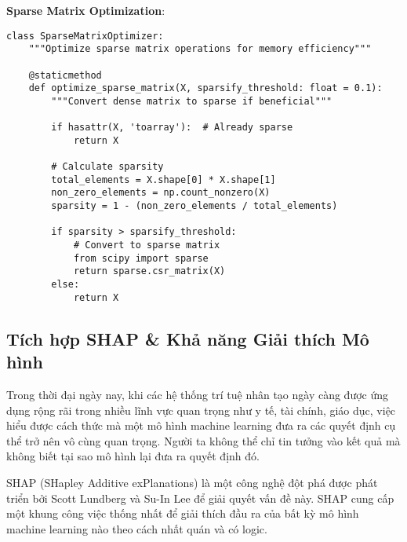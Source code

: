 \textbf{Sparse Matrix Optimization}:

\begin{verbatim}
class SparseMatrixOptimizer:
    """Optimize sparse matrix operations for memory efficiency"""
    
    @staticmethod
    def optimize_sparse_matrix(X, sparsify_threshold: float = 0.1):
        """Convert dense matrix to sparse if beneficial"""
        
        if hasattr(X, 'toarray'):  # Already sparse
            return X
            
        # Calculate sparsity
        total_elements = X.shape[0] * X.shape[1]
        non_zero_elements = np.count_nonzero(X)
        sparsity = 1 - (non_zero_elements / total_elements)
        
        if sparsity > sparsify_threshold:
            # Convert to sparse matrix
            from scipy import sparse
            return sparse.csr_matrix(X)
        else:
            return X
\end{verbatim}

\subsection{Tích hợp SHAP \& Khả năng Giải thích Mô hình}\label{subsec:shap-integration}

\noindent
Trong thời đại ngày nay, khi các hệ thống trí tuệ nhân tạo ngày càng được ứng dụng rộng rãi trong nhiều lĩnh vực quan trọng như y tế, tài chính, giáo dục, việc hiểu được cách thức mà một mô hình machine learning đưa ra các quyết định cụ thể trở nên vô cùng quan trọng. Người ta không thể chỉ tin tưởng vào kết quả mà không biết tại sao mô hình lại đưa ra quyết định đó.

SHAP (SHapley Additive exPlanations) là một công nghệ đột phá được phát triển bởi Scott Lundberg và Su-In Lee để giải quyết vấn đề này. SHAP cung cấp một khung công việc thống nhất để giải thích đầu ra của bất kỳ mô hình machine learning nào theo cách nhất quán và có logic.

